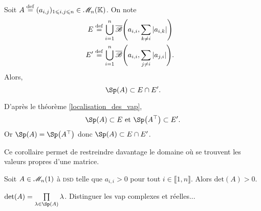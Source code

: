 \begin{corol}
    Soit $A \overset{\mathrm{\tiny def}}{=} (a_{i,j})_{1 \leqslant i, j \leqslant n} \in \mathscr{M}_n(\mathbb{K})$. On note
    \begin{align*}
        E &\overset{\mathrm{\tiny def}}{=} \bigcup\limits_{i=1}^{n} \overline{\mathscr{B}} \Bigg( a_{i,i}, \sum\limits_{k \not = i} |a_{i,k}| \Bigg) \quad\\
        E' &\overset{\mathrm{\tiny def}}{=} \bigcup\limits_{i=1}^{n} \overline{\mathscr{B}} \Bigg( a_{i,i}, \sum\limits_{j \not = i} |a_{j, i}| \Bigg).
    \end{align*}
    Alors,
    $$\Sp(A) \subset E \cap E'.$$
\end{corol}

\begin{preuve}
    D'après le théorème \ref{localisation_des_vap}, 
    $$\Sp(A) \subset E \text{ et } \Sp \big( \Trsp{A} \big) \subset E'.$$
    Or $\Sp(A) = \Sp \big( \Trsp{A} \big)$ donc $\Sp(A) \subset E \cap E'$.
\end{preuve}    

Ce corollaire permet de restreindre davantage le domaine où se trouvent les valeurs propres d'une matrice. 

\begin{prop}{}
    Soit $A \in \mathscr{M}_n(1)$ à \textsc{dsd} telle que $a_{i,i} > 0$ pour tout $i \in \llbracket 1, n \rrbracket$. Alors $\mathrm{det}(A) > 0$. 
\end{prop}

\begin{preuve}
        $\det(A) = \prod\limits_{\lambda \in \Sp(A)} \lambda$. Distinguer les vap complexes et réelles...
\end{preuve}
